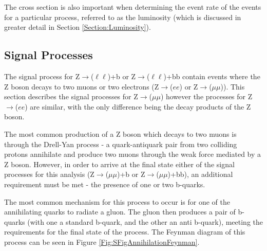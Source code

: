 \documentclass[12pt,a4paper,epsf,portrait,times,epsfig]{report}
\begin{document}
	The cross section is also important when determining the event rate of the events for a particular process, referred to as the luminosity (which is discussed in greater detail in Section \ref{Section:Luminosity}). 


	\subsection{Signal Processes}
		
		The signal process for Z$\rightarrow$($\ell\ell$)+b or Z$\rightarrow$($\ell\ell$)+bb contain events where the Z boson decays to two muons or two electrons (Z$\rightarrow$($ee$) or Z$\rightarrow$($\mu\mu$)). This section describes the signal processes for Z$\rightarrow$($\mu\mu$) however the processes for Z$\rightarrow$($ee$) are similar, with the only difference being the decay products of the Z boson. \par
		
		The most common production of a Z boson which decays to two muons is through the Drell-Yan process \cite{Article:DrellYan} - a quark-antiquark pair from two colliding protons annihilate and produce two muons through the weak force mediated by a Z boson. However, in order to arrive at the final state either of the signal processes for this analysis (Z$\rightarrow$($\mu\mu$)+b or Z$\rightarrow$($\mu\mu$)+bb), an additional requirement must be met - the presence of one or two b-quarks. \par
		 
		The most common mechanism for this process to occur is for one of the annihilating quarks to radiate a gluon. The gluon then produces a pair of b-quarks (with one a standard b-quark, and the other an anti b-quark), meeting the requirements for the final state of the process. The Feynman diagram of this process can be seen in Figure \ref{Fig:SFigAnnihilationFeynman}. \par
		
\end{document}
